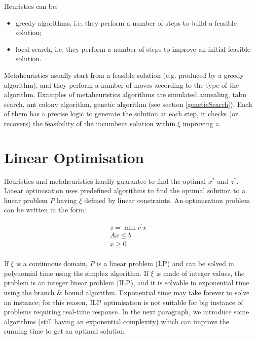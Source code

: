 Heuristics can be:

\begin{itemize}
    \item greedy algorithms, i.e. they perform a number of steps to build a feasible solution;
    \item local search, i.e. they perform a number of steps to improve an initial feasible solution.
\end{itemize}

Metaheuristics usually start from a feasible solution (e.g. produced by a greedy algorithm), and they perform a number of moves according to the type of the algorithm. Examples of metaheuristics algorithms are simulated annealing, tabu search, ant colony algorithm, genetic algorithm (see section \ref{geneticSearch}). Each of them has a precise logic to generate the solution at each step, it checks (or recovers) the feasibility of the incumbent solution within $\xi$ improving $z$.

\section{Linear Optimisation}

Heuristics and metaheuristics hardly guarantee to find the optimal $x^\ast$ and $z^\ast$. Linear optimisation uses predefined algorithms to find the optimal solution to a linear problem $P$ having $\xi$ defined by linear constraints. An optimisation problem can be written in the form:

\begin{equation}
\begin{split}
    z=\min{c^\prime x} \\
    Ax\le b \\
    x\geq0 \\
\end{split}
\label{eq_linearProblem}
\end{equation}

If $\xi$ is a continuous domain, $P$ is a linear problem (LP) and can be solved in polynomial time using the simplex algorithm. If $\xi$ is made of integer values, the problem is an integer linear problem (ILP), and it is solvable in exponential time using the branch \& bound algorithm. Exponential time may take forever to solve an instance; for this reason, ILP optimisation is not suitable for big instance of problems requiring real-time response. In the next paragraph, we introduce some algorithms (still having an exponential complexity) which can improve the running time to get an optimal solution.

